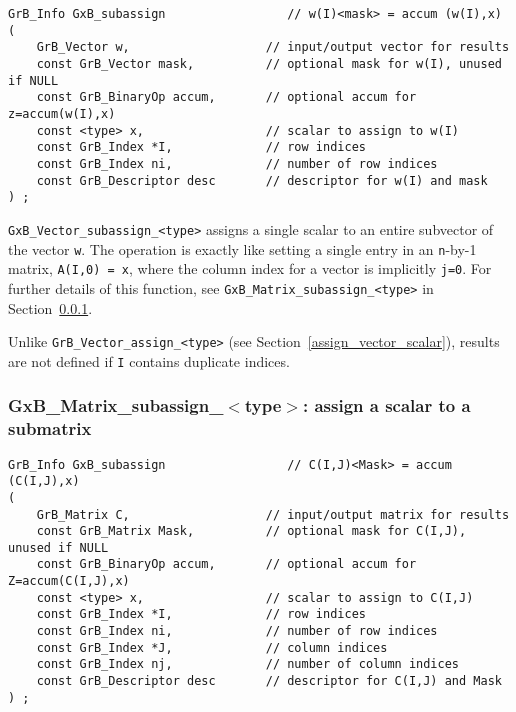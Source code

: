 \documentclass[12pt]{article}
\begin{document}
\begin{mdframed}[userdefinedwidth=6in]
{\footnotesize
\begin{verbatim}
GrB_Info GxB_subassign                 // w(I)<mask> = accum (w(I),x)
(
    GrB_Vector w,                   // input/output vector for results
    const GrB_Vector mask,          // optional mask for w(I), unused if NULL
    const GrB_BinaryOp accum,       // optional accum for z=accum(w(I),x)
    const <type> x,                 // scalar to assign to w(I)
    const GrB_Index *I,             // row indices
    const GrB_Index ni,             // number of row indices
    const GrB_Descriptor desc       // descriptor for w(I) and mask
) ;
\end{verbatim} } \end{mdframed}

\verb'GxB_Vector_subassign_<type>' assigns a single scalar to an entire
subvector of the vector \verb'w'.  The operation is exactly like setting a
single entry in an \verb'n'-by-1 matrix, \verb'A(I,0) = x', where the column
index for a vector is implicitly \verb'j=0'.  For further details of this
function, see \verb'GxB_Matrix_subassign_<type>' in
Section~\ref{subassign_matrix_scalar}.

Unlike \verb'GrB_Vector_assign_<type>' (see Section~\ref{assign_vector_scalar}),
results are not defined if \verb'I' contains duplicate indices.

\newpage
\subsubsection{{\sf GxB\_Matrix\_subassign\_$<$type$>$:} assign a scalar to a submatrix}
\label{subassign_matrix_scalar}

\begin{mdframed}[userdefinedwidth=6in]
{\footnotesize
\begin{verbatim}
GrB_Info GxB_subassign                 // C(I,J)<Mask> = accum (C(I,J),x)
(
    GrB_Matrix C,                   // input/output matrix for results
    const GrB_Matrix Mask,          // optional mask for C(I,J), unused if NULL
    const GrB_BinaryOp accum,       // optional accum for Z=accum(C(I,J),x)
    const <type> x,                 // scalar to assign to C(I,J)
    const GrB_Index *I,             // row indices
    const GrB_Index ni,             // number of row indices
    const GrB_Index *J,             // column indices
    const GrB_Index nj,             // number of column indices
    const GrB_Descriptor desc       // descriptor for C(I,J) and Mask
) ;
\end{verbatim} } \end{mdframed}
\end{document}
